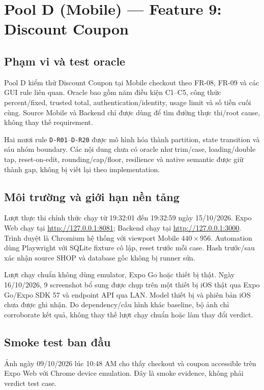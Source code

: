 \chapter{Pool D (Mobile) --- Feature 9: Discount Coupon}

\section{Phạm vi và test oracle}

Pool D kiểm thử Discount Coupon tại Mobile checkout theo FR-08, FR-09 và các
GUI rule liên quan. Oracle bao gồm năm điều kiện C1--C5, công thức percent/fixed,
trusted total, authentication/identity, usage limit và số tiền cuối cùng. Source
Mobile và Backend chỉ được dùng để tìm đường thực thi/root cause, không thay thế
requirement.

Hai mươi rule \texttt{D-R01}--\texttt{D-R20} được mô hình hóa thành partition,
state transition và sáu nhóm boundary. Các nội dung chưa có oracle như trim/case,
loading/double tap, reset-on-edit, rounding/cap/floor, resilience và native
semantic được giữ thành gap, không bị viết lại theo implementation.

\section{Môi trường và giới hạn nền tảng}

Lượt thực thi chính thức chạy từ 19:32:01 đến 19:32:59 ngày 15/10/2026.
Expo Web chạy tại \url{http://127.0.0.1:8081}; Backend chạy tại
\url{http://127.0.0.1:3000}. Trình duyệt là Chromium hệ thống với viewport
Mobile \(440 \times 956\). Automation dùng Playwright với SQLite fixture cô lập,
reset trước mỗi case. Hash trước/sau xác nhận source SHOP và database gốc không
bị runner sửa.

Lượt chạy chuẩn không dùng emulator, Expo Go hoặc thiết bị thật. Ngày 16/10/2026,
9 screenshot bổ sung được chụp trên một thiết bị iOS thật qua Expo Go/Expo SDK 57
và endpoint API qua LAN. Model thiết bị và phiên bản iOS chưa được ghi nhận. Do
dependency/cấu hình khác baseline, bộ ảnh chỉ corroborate kết quả, không thay thế
lượt chạy chuẩn hoặc làm thay đổi verdict.

\section{Smoke test ban đầu}

Ảnh ngày 09/10/2026 lúc 10:48 AM cho thấy checkout và coupon accessible trên
Expo Web với Chrome device emulation. Đây là smoke evidence, không phải verdict
test case.

